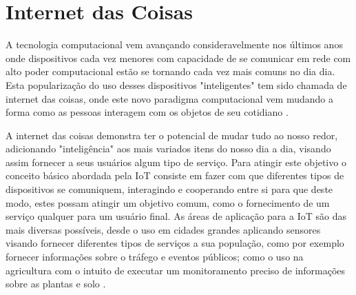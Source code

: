 \documentclass[tid,table]{texufpel} %
\begin{document}
\section{Internet das Coisas}

A tecnologia computacional vem avançando consideravelmente nos últimos anos onde dispositivos cada vez menores com capacidade de se comunicar em rede com alto poder computacional estão se tornando cada vez mais comuns no dia dia. Esta popularização do uso desses dispositivos "inteligentes" tem sido chamada de internet das coisas, onde este novo paradigma computacional vem mudando a forma como as pessoas interagem com os objetos de seu cotidiano \cite{xavier2016smart}.

A internet das coisas demonstra ter o potencial de mudar tudo ao nosso redor, adicionando "inteligência" aos mais variados itens do nosso dia a dia, visando assim fornecer a seus usuários algum tipo de serviço. Para atingir este objetivo o conceito básico abordada pela IoT consiste em fazer com que diferentes tipos de dispositivos se comuniquem, interagindo e cooperando entre si para que deste modo, estes possam atingir um objetivo comum, como o fornecimento de um serviço qualquer para um usuário final. As áreas de aplicação para a IoT são das mais diversas possíveis, desde o uso em cidades grandes aplicando sensores visando fornecer diferentes tipos de serviços a sua população, como por exemplo fornecer informações sobre o tráfego e eventos públicos; como o uso na agricultura com o intuito de executar um monitoramento preciso de  informações sobre as plantas e solo \cite{gonccalves2017research}.
\end{document}
